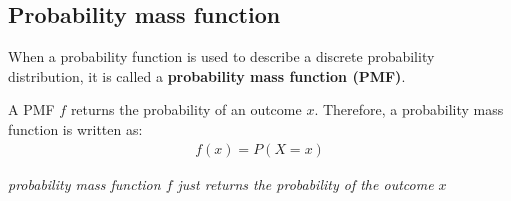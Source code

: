 \documentclass[10pt,a4paper]{article}
\begin{document}
\subsection{Probability mass function}

When a probability function is used to describe a discrete probability distribution, it is called a
\textbf{probability mass function (PMF)}.

A PMF $f$ returns the probability of an outcome $x$. Therefore, a probability mass function is written
as:
\begin{align*}
    f(x) = P(X=x)
\end{align*}
\begin{center}
    \textit{probability mass function $f$ just returns the probability of the outcome $x$}
\end{center}
\end{document}
